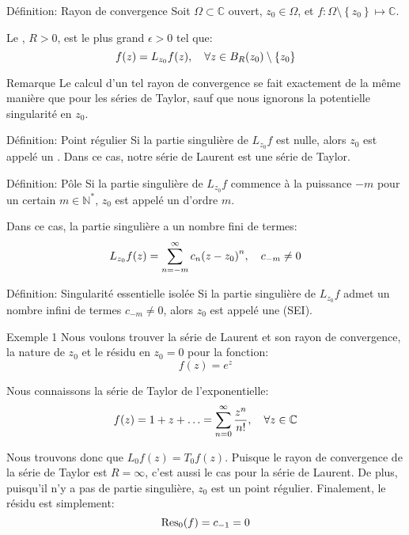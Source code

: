\documentclass[a4paper]{article}
\begin{document}
\begin{parag}{Définition: Rayon de convergence}
    Soit $\Omega \subset \mathbb{C}$ ouvert, $z_0 \in \Omega$, et $f: \Omega \setminus \left\{z_0\right\} \mapsto \mathbb{C}$. 

    Le , $R > 0$, est le plus grand $\epsilon > 0$ tel que: 
    \[f\left(z\right) = L_{z_0} f\left(z\right), \mathspace \forall z \in B_R\left(z_0\right) \setminus \left\{z_0\right\}\]

    \begin{subparag}{Remarque}
        Le calcul d'un tel rayon de convergence se fait exactement de la même manière que pour les séries de Taylor, sauf que nous ignorons la potentielle singularité en $z_0$.
    \end{subparag}
    
\end{parag}

\begin{parag}{Définition: Point régulier}
    Si la partie singulière de $L_{z_0}f$ est nulle, alors $z_0$ est appelé un . Dans ce cas, notre série de Laurent est une série de Taylor.
\end{parag}

\begin{parag}{Définition: Pôle}
    Si la partie singulière de $L_{z_0} f$ commence à la puissance $-m$ pour un certain $m \in \mathbb{N}^*$, $z_0$ est appelé un  d'ordre $m$.

    Dans ce cas, la partie singulière a un nombre fini de termes: 
    \[L_{z_0} f\left(z\right) = \sum_{n=-m}^{\infty} c_n \left(z-z_0\right)^n, \mathspace c_{-m} \neq 0\]
\end{parag}

\begin{parag}{Définition: Singularité essentielle isolée}
    Si la partie singulière de $L_{z_0}f$ admet un nombre infini de termes $c_{-m} \neq 0$, alors $z_0$ est appelé une  (SEI).
\end{parag}

\begin{parag}{Exemple 1}
    Nous voulons trouver la série de Laurent et son rayon de convergence, la nature de $z_0$ et le résidu en $z_0 = 0$ pour la fonction: 
    \[f\left(z\right) = e^z\]
    
    Nous connaissons la série de Taylor de l'exponentielle: 
    \[f\left(z\right) = 1 + z + \ldots = \sum_{n=0}^{\infty} \frac{z^n}{n!}, \mathspace \forall z \in \mathbb{C}\]
    
    Nous trouvons donc que $L_{0}f\left(z\right) = T_{0} f\left(z\right)$. Puisque le rayon de convergence de la série de Taylor est $R = \infty$, c'est aussi le cas pour la série de Laurent. De plus, puisqu'il n'y a pas de partie singulière, $z_0$ est un point régulier. Finalement, le résidu est simplement: 
    \[\Res_0\left(f\right) = c_{-1} = 0\]
\end{parag}
\end{document}
